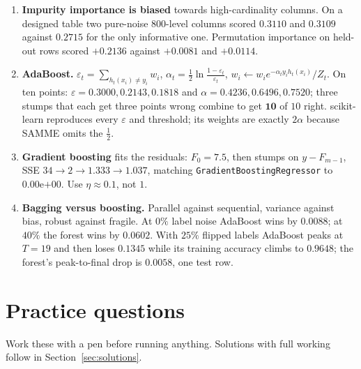 \documentclass[11pt]{article}
\begin{document}
\begin{enumerate}[leftmargin=*]
  \item \textbf{Impurity importance is biased} towards high-cardinality
    columns. On a designed table two pure-noise $800$-level columns scored
    $0.3110$ and $0.3109$ against $0.2715$ for the only informative one.
    Permutation importance on held-out rows scored $\mathbf{+0.2136}$ against
    $+0.0081$ and $+0.0114$.
  \item \textbf{AdaBoost.} $\varepsilon_t = \sum_{h_t(x_i)\neq y_i} w_i$,
    $\alpha_t = \frac12\ln\frac{1-\varepsilon_t}{\varepsilon_t}$,
    $w_i \leftarrow w_i e^{-\alpha_t y_i h_t(x_i)}/Z_t$. On ten points:
    $\varepsilon = 0.3000, 0.2143, 0.1818$ and
    $\alpha = 0.4236, 0.6496, 0.7520$; three stumps that each get three points
    wrong combine to get $\mathbf{10}$ of $10$ right. scikit-learn reproduces
    every $\varepsilon$ and threshold; its weights are exactly $2\alpha$
    because SAMME omits the $\frac12$.
  \item \textbf{Gradient boosting} fits the residuals: $F_0 = 7.5$, then
    stumps on $y - F_{m-1}$, SSE $34 \to 2 \to 1.333 \to \mathbf{1.037}$,
    matching \texttt{GradientBoostingRegressor} to $0.00\mathrm{e}{+00}$. Use
    $\eta \approx 0.1$, not $1$.
  \item \textbf{Bagging versus boosting.} Parallel against sequential,
    variance against bias, robust against fragile. At $0\%$ label noise
    AdaBoost wins by $0.0088$; at $40\%$ the forest wins by $\mathbf{0.0602}$.
    With $25\%$ flipped labels AdaBoost peaks at $T = 19$ and then loses
    $0.1345$ while its training accuracy climbs to $0.9648$; the forest's
    peak-to-final drop is $0.0058$, one test row.
\end{enumerate}

\section{Practice questions}
\label{sec:practice}

Work these with a pen before running anything. Solutions with full working
follow in Section~\ref{sec:solutions}.
\end{document}
